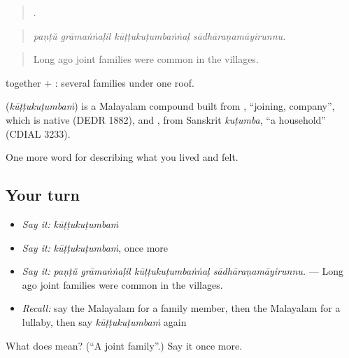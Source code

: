 \begin{quote}
   .
\end{quote}

\begin{quote}
\emph{paṇṭŭ grāmaṅṅaḷil kūṭṭukuṭumbaṅṅaḷ sādhāraṇamāyirunnu.}
\end{quote}

\begin{quote}
Long ago joint families were common in the villages.
\end{quote}

 together + : several families under one roof.

\begin{cousinweb}
\textbf{} (\emph{kūṭṭukuṭumbaṁ}) is a Malayalam compound built from , \textquotedblleft{}joining, company\textquotedblright{}, which is native (DEDR 1882), and , from Sanskrit \emph{kuṭumba}, \textquotedblleft{}a household\textquotedblright{} (CDIAL 3233).
\end{cousinweb}

\begin{grammarlens}[title={What you've built}]
One more word for describing what you lived and felt.
\end{grammarlens}

\subsection*{Your turn}
\begin{itemize}
\raggedright
  \item \emph{Say it:} \emph{kūṭṭukuṭumbaṁ}
  \item \emph{Say it:} \emph{kūṭṭukuṭumbaṁ}, once more
  \item \emph{Say it:} \emph{paṇṭŭ grāmaṅṅaḷil kūṭṭukuṭumbaṅṅaḷ sādhāraṇamāyirunnu.} — Long ago joint families were common in the villages.
  \item \emph{Recall:} say the Malayalam for a family member, then the Malayalam for a lullaby, then say \emph{kūṭṭukuṭumbaṁ} again
\end{itemize}

\begin{tcolorbox}[breakable,colback=teal!4,colframe=teal!35!black,title={Before you move on}]
What does  mean? (\textquotedblleft{}A joint family\textquotedblright{}.) Say it once more.
\end{tcolorbox}
